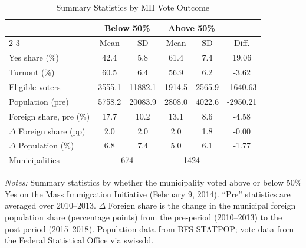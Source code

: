 \begin{table}[t]
\centering
\caption{Summary Statistics by MII Vote Outcome}
\label{tab:summary}
\begin{tabular}{lccccc}
\hline\hline
 & \multicolumn{2}{c}{Below 50\%} & \multicolumn{2}{c}{Above 50\%} & \\
\cline{2-3} \cline{4-5}
 & Mean & SD & Mean & SD & Diff. \\
\hline
Yes share (\%) & 42.4 & 5.8 & 61.4 & 7.4 & 19.06 \\
Turnout (\%) & 60.5 & 6.4 & 56.9 & 6.2 & -3.62 \\
Eligible voters & 3555.1 & 11882.1 & 1914.5 & 2565.9 & -1640.63 \\
Population (pre) & 5758.2 & 20083.9 & 2808.0 & 4022.6 & -2950.21 \\
Foreign share, pre (\%) & 17.7 & 10.2 & 13.1 & 8.6 & -4.58 \\
$\Delta$ Foreign share (pp) & 2.0 & 2.0 & 2.0 & 1.8 & -0.00 \\
$\Delta$ Population (\%) & 6.8 & 7.4 & 5.0 & 6.1 & -1.77 \\
\hline
Municipalities & \multicolumn{2}{c}{674} & \multicolumn{2}{c}{1424} & \\
\hline\hline
\end{tabular}
\begin{tablenotes}[flushleft]
\small
\item \textit{Notes:} Summary statistics by whether the municipality voted above or below 50\% Yes on the Mass Immigration Initiative (February 9, 2014). ``Pre'' statistics are averaged over 2010--2013. $\Delta$ Foreign share is the change in the municipal foreign population share (percentage points) from the pre-period (2010--2013) to the post-period (2015--2018). Population data from BFS STATPOP; vote data from the Federal Statistical Office via swissdd.
\end{tablenotes}
\end{table}

